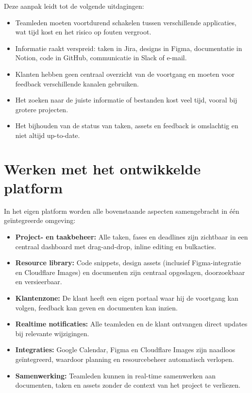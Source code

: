Deze aanpak leidt tot de volgende uitdagingen:
\begin{itemize}
    \item Teamleden moeten voortdurend schakelen tussen verschillende applicaties, wat tijd kost en het risico op fouten vergroot.
    \item Informatie raakt verspreid: taken in Jira, designs in Figma, documentatie in Notion, code in GitHub, communicatie in Slack of e-mail.
    \item Klanten hebben geen centraal overzicht van de voortgang en moeten voor feedback verschillende kanalen gebruiken.
    \item Het zoeken naar de juiste informatie of bestanden kost veel tijd, vooral bij grotere projecten.
    \item Het bijhouden van de status van taken, assets en feedback is omslachtig en niet altijd up-to-date.
\end{itemize}

\section{Werken met het ontwikkelde platform}
\label{sec:casus-eigen-platform}

In het eigen platform worden alle bovenstaande aspecten samengebracht in één geïntegreerde omgeving:
\begin{itemize}
    \item \textbf{Project- en taakbeheer:} Alle taken, fases en deadlines zijn zichtbaar in een centraal dashboard met drag-and-drop, inline editing en bulkacties.
    \item \textbf{Resource library:} Code snippets, design assets (inclusief Figma-integratie en Cloudflare Images) en documenten zijn centraal opgeslagen, doorzoekbaar en versieerbaar.
    \item \textbf{Klantenzone:} De klant heeft een eigen portaal waar hij de voortgang kan volgen, feedback kan geven en documenten kan inzien.
    \item \textbf{Realtime notificaties:} Alle teamleden en de klant ontvangen direct updates bij relevante wijzigingen.
    \item \textbf{Integraties:} Google Calendar, Figma en Cloudflare Images zijn naadloos geïntegreerd, waardoor planning en resourcebeheer automatisch verlopen.
    \item \textbf{Samenwerking:} Teamleden kunnen in real-time samenwerken aan documenten, taken en assets zonder de context van het project te verliezen.
\end{itemize}

